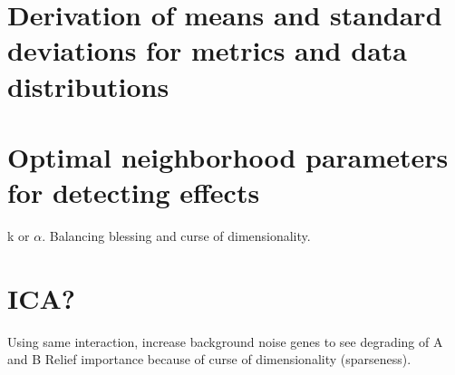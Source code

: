 \documentclass[10pt,letterpaper]{article}\usepackage[]{graphicx}\usepackage[]{color}
\begin{document}
\section{Derivation of means and standard deviations for metrics and data distributions}

\section{Optimal neighborhood parameters for detecting effects}
k or $\alpha$. 
Balancing blessing and curse of dimensionality.


\section{ICA?}

Using same interaction, increase background noise genes to see degrading of A and B Relief importance because of curse of dimensionality (sparseness).  


\end{document}
